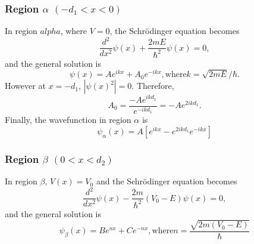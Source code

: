 \documentclass[aps,twocolumn,secnumarabic,nobalancelastpage,amsmath,amssymb,
nofootinbib]{revtex4}
\begin{document}
\subsubsection{Region $\alpha$ $(-d_1 < x < 0)$}
In region $alpha$, where $V=0$, the Schr\"odinger equation becomes
\begin{equation}
\frac{d^2}{dx^2}\psi(x) + \frac{2mE}{\hbar^2}\psi(x) = 0,
\label{eq:schro_lt_V0_reg1}
\end{equation}
%
and the general solution is
\begin{subequations}
\label{eq:sol_lt_V0_reg1}
\begin{equation}
\psi(x) = A e^{ikx} + A_0 e^{-ikx},
\label{subeq:sol_lt_V0_reg1_a}
\end{equation}
\text{where}
\begin{equation}
k=\sqrt{2mE}/\hbar.
\label{subeq:sol_lt_V0_reg1_b}
\end{equation}
\end{subequations}
%
However at $x=-d_1$, $|\psi(x)^2|=0$. Therefore,
\begin{equation}
A_0 = \frac{-A e^{ikd_1}}{e^{-ikd_1}} = -A e^{2ikd_1}.
\label{eq:A0_defn}
\end{equation}
%
Finally, the wavefunction in region $\alpha$ is
\begin{equation}
\psi_\alpha(x)=A[e^{ikx} - e^{2ikd_1}e^{-ikx}]
\label{eq:psi_lt_V0_reg1}
\end{equation}

\subsubsection{Region $\beta$ $(0 < x < d_2)$}
In region $\beta$, $V(x)=V_0$ and the Schr\"odinger equation becomes
\begin{equation}
\frac{d^2}{dx^2}\psi(x) - \frac{2m}{\hbar^2}(V_0-E)\psi(x) = 0,
\label{eq:schro_lt_V0_reg2}
\end{equation}
%
and the general solution is
\begin{subequations}
\label{eq:sol_lt_V0_reg2}
\begin{equation}
\psi_\beta(x)=Be^{nx} + Ce^{-nx},
\end{equation}
\text{where}
\begin{equation}
n=\frac{\sqrt{2m(V_0-E)}}{\hbar}
\end{equation}
\end{subequations}

\end{document}
